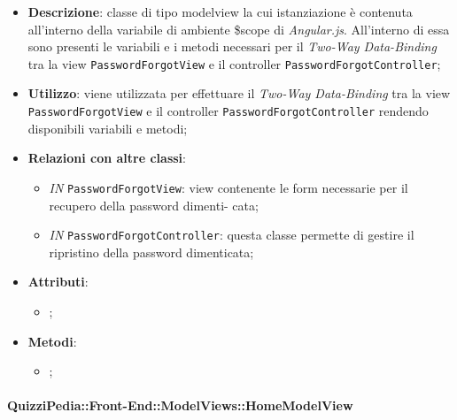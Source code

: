	\begin{itemize}
		\item \textbf{Descrizione}: classe di tipo modelview la cui istanziazione è contenuta all'interno della variabile di ambiente \$scope di \textit{Angular.js}. All'interno di essa sono presenti le variabili e i metodi necessari per il \textit{Two-Way Data-Binding} tra la view \texttt{PasswordForgotView} e il controller \texttt{PasswordForgotController};
		\item \textbf{Utilizzo}: viene utilizzata per effettuare il \textit{Two-Way Data-Binding} tra la view \texttt{PasswordForgotView} e il controller \texttt{PasswordForgotController} rendendo disponibili variabili e metodi;
		\item \textbf{Relazioni con altre classi}: 
		\begin{itemize}
			\item \textit{IN} \texttt{PasswordForgotView}: view contenente le form necessarie per il recupero della password dimenti- cata; 
			\item \textit{IN} \texttt{PasswordForgotController}: questa classe permette di gestire il ripristino della password dimenticata;
		\end{itemize}
		\item \textbf{Attributi}: 
		\begin{itemize}
			\item ;
		\end{itemize}
		\item \textbf{Metodi}: 
		\begin{itemize}
			\item ;
		\end{itemize}
	\end{itemize}
	
	\paragraph{QuizziPedia::Front-End::ModelViews::HomeModelView}
	
	\label{QuizziPedia::Front-End::ModelViews::HomeModelView}
	
